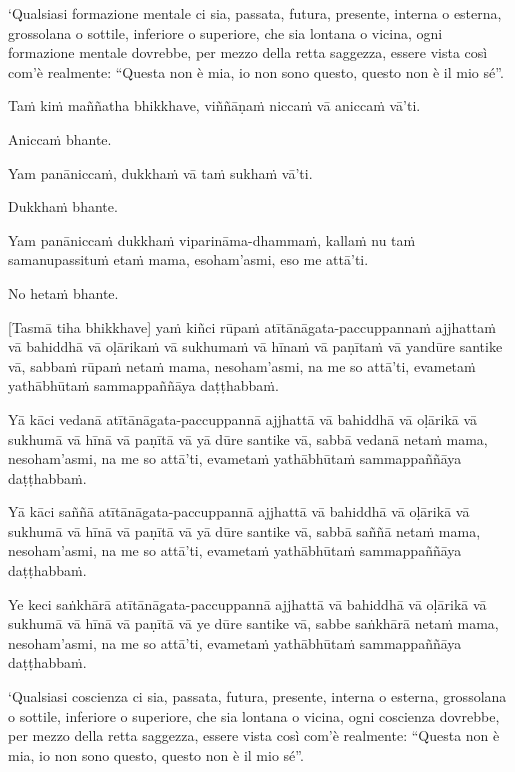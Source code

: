 ‘Qualsiasi formazione mentale ci sia, passata, futura, presente, interna
o esterna, grossolana o sottile, inferiore o superiore, che sia lontana
o vicina, ogni formazione mentale dovrebbe, per mezzo della retta saggezza, essere vista
così com'è realmente: “Questa non è mia, io non sono questo, questo non è il
mio sé”.

\clearpage

\paliText
\markboth{\paliTitle}{\rightmark}

Taṁ kiṁ maññatha bhikkhave, viññāṇaṁ niccaṁ vā aniccaṁ vā'ti.

Aniccaṁ bhante.

Yam panāniccaṁ, dukkhaṁ vā taṁ sukhaṁ vā'ti.

Dukkhaṁ bhante.

Yam panāniccaṁ dukkhaṁ viparināma-dhammaṁ, kallaṁ nu taṁ samanupassituṁ
etaṁ mama, esoham'asmi, eso me attā'ti.

No hetaṁ bhante.

[Tasmā tiha bhikkhave] yaṁ kiñci rūpaṁ atītānāgata-paccuppannaṁ ajjhattaṁ
vā bahiddhā vā oḷārikaṁ vā sukhumaṁ vā hīnaṁ vā paṇītaṁ vā yandūre
santike vā, sabbaṁ rūpaṁ netaṁ mama, nesoham'asmi, na me so attā'ti,
evametaṁ yathābhūtaṁ sammappaññāya daṭṭhabbaṁ.

Yā kāci vedanā atītānāgata-paccuppannā ajjhattā vā bahiddhā vā oḷārikā
vā sukhumā vā hīnā vā paṇītā vā yā dūre santike vā, sabbā vedanā netaṁ
mama, nesoham'asmi, na me so attā'ti, evametaṁ yathābhūtaṁ sammappaññāya
daṭṭhabbaṁ.

Yā kāci saññā atītānāgata-paccuppannā ajjhattā vā bahiddhā vā oḷārikā vā
sukhumā vā hīnā vā paṇītā vā yā dūre santike vā, sabbā saññā netaṁ mama,
nesoham'asmi, na me so attā'ti, evametaṁ yathābhūtaṁ sammappaññāya
daṭṭhabbaṁ.

Ye keci saṅkhārā atītānāgata-paccuppannā ajjhattā vā bahiddhā vā oḷārikā
vā sukhumā vā hīnā vā paṇītā vā ye dūre santike vā, sabbe saṅkhārā netaṁ
mama, nesoham'asmi, na me so attā'ti, evametaṁ yathābhūtaṁ sammappaññāya
daṭṭhabbaṁ.

\clearpage

\englishText
\markboth{\englishTitle}{\rightmark}

‘Qualsiasi coscienza ci sia, passata, futura, presente, interna o
esterna, grossolana o sottile, inferiore o superiore, che sia lontana o vicina,
ogni coscienza dovrebbe, per mezzo della retta saggezza, essere vista così com'è realmente:
“Questa non è mia, io non sono questo, questo non è il mio sé”.

